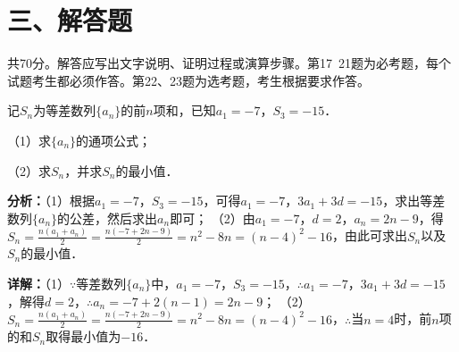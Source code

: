 \section*{三、解答题}
共70分。解答应写出文字说明、证明过程或演算步骤。第17~21题为必考题，每个试题考生都必须作答。第22、23题为选考题，考生根据要求作答。

\begin{question}[points=12]
记$S_n$为等差数列$\{a_n\}$的前$n$项和，已知$a_1=-7$，$S_3=-15$．

（1）求$\{a_n\}$的通项公式；

（2）求$S_n$，并求$S_n$的最小值．
\begin{solution}

\textbf{分析：}（1）根据$a_1=-7$，$S_3=-15$，可得$a_1=-7$，$3a_1+3d=-15$，求出等差数列$\{a_n\}$的公差，然后求出$a_n$即可；
（2）由$a_1=-7$，$d=2$，$a_n=2n-9$，得$S_n=\frac{n(a_1+a_n)}{2}=\frac{n(-7+2n-9)}{2}=n^2-8n=(n-4)^2-16$，由此可求出$S_n$以及$S_n$的最小值．

\textbf{详解：}（1）$\because$等差数列$\{a_n\}$中，$a_1=-7$，$S_3=-15$，$\therefore a_1=-7$，$3a_1+3d=-15$，解得$d=2$，$\therefore a_n=-7+2(n-1)=2n-9$；
（2）$S_n=\frac{n(a_1+a_n)}{2}=\frac{n(-7+2n-9)}{2}=n^2-8n=(n-4)^2-16$，$\therefore$当$n=4$时，前$n$项的和$S_n$取得最小值为$-16$．
\end{solution}
\end{question}

